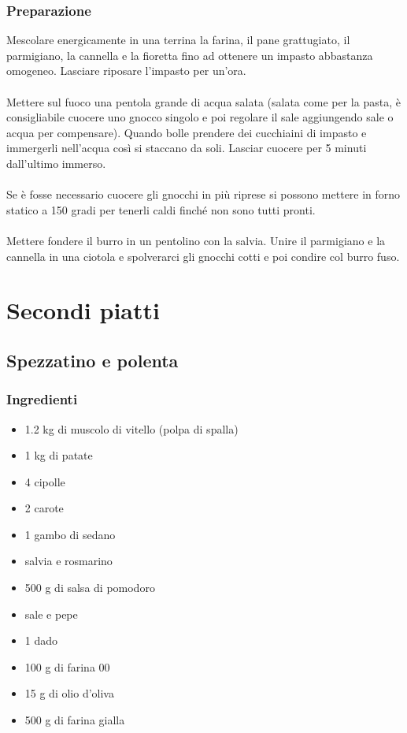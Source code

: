 \documentclass[12pt, a4paper]{article}
\begin{document}
\subsubsection{Preparazione}
	Mescolare energicamente in una terrina la farina, il pane grattugiato,
	il parmigiano, la cannella e la fioretta fino ad ottenere un impasto
	abbastanza omogeneo. Lasciare riposare l'impasto per un'ora.\\\\
	Mettere sul fuoco una pentola grande di acqua salata (salata come per la pasta, 
	è consigliabile cuocere uno gnocco singolo e poi regolare il sale aggiungendo 
	sale o acqua per compensare). Quando bolle prendere dei cucchiaini di impasto e 
	immergerli nell'acqua così si staccano	da soli. Lasciar cuocere per 5 minuti
	dall'ultimo immerso.\\\\
	Se è fosse necessario cuocere gli gnocchi in più riprese si possono
	mettere in forno statico a 150 gradi per tenerli caldi finché non sono tutti 
	pronti.\\\\
	Mettere fondere il burro in un pentolino con la salvia. Unire il parmigiano e
	la cannella in una ciotola e spolverarci gli gnocchi cotti e poi condire col burro
	fuso.
\clearpage

\section{Secondi piatti}

\subsection{Spezzatino e polenta}

\subsubsection{Ingredienti}
\begin{itemize}
\item   1.2 kg di muscolo di vitello (polpa di spalla)
\item 	1 kg di patate
\item 	4 cipolle
\item 	2 carote
\item 	1 gambo di sedano
\item 	salvia e rosmarino
\item 	500 g di salsa di pomodoro
\item 	sale e pepe
\item 	1 dado
\item 	100 g di farina 00
\item 	15 g di olio d'oliva
\item 	500 g di farina gialla
\end{itemize}
\end{document}

